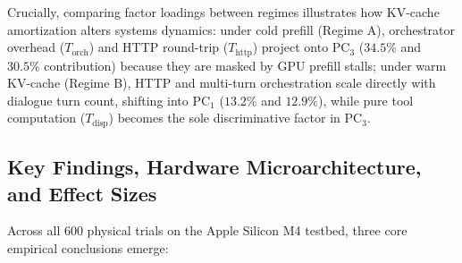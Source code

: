\documentclass[preprint,12pt,3p]{elsarticle}
\begin{document}
Crucially, comparing factor loadings between regimes illustrates how KV-cache amortization alters systems dynamics: under cold prefill (Regime A), orchestrator overhead ($T_{\text{orch}}$) and HTTP round-trip ($T_{\text{http}}$) project onto $\text{PC}_3$ ($34.5\%$ and $30.5\%$ contribution) because they are masked by GPU prefill stalls; under warm KV-cache (Regime B), HTTP and multi-turn orchestration scale directly with dialogue turn count, shifting into $\text{PC}_1$ ($13.2\%$ and $12.9\%$), while pure tool computation ($T_{\text{disp}}$) becomes the sole discriminative factor in $\text{PC}_3$.

\subsection{Key Findings, Hardware Microarchitecture, and Effect Sizes}
Across all 600 physical trials on the Apple Silicon M4 testbed, three core empirical conclusions emerge:
\end{document}

